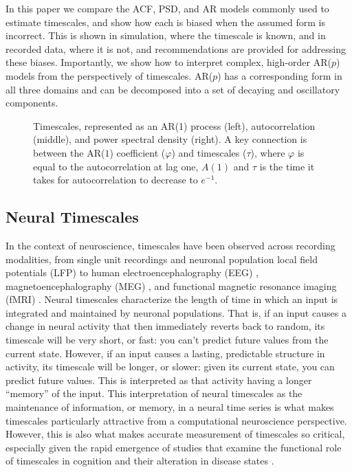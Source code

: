 \documentclass[pdflatex,lineno,sn-nature]{sn-jnl}
\theoremstyle{thmstyleone}
\theoremstyle{thmstyletwo}
\theoremstyle{thmstylethree}
\begin{document}
In this paper we compare the ACF, PSD, and AR models commonly used to estimate timescales, and show how each is biased when the assumed form is incorrect. This is shown in simulation, where the timescale is known, and in recorded data, where it is not, and recommendations are provided for addressing these biases. Importantly, we show how to interpret complex, high-order AR($p$) models from the perspectively of timescales. AR($p$) has a corresponding form in all three domains and can be decomposed into a set of decaying and oscillatory components.

\begin{figure}[htbp]
  \centering
  
  \caption{Timescales, represented as an AR(1) process (left), autocorrelation (middle), and power spectral density (right). A key connection is between the AR($1$) coefficient ($\varphi$) and timescales ($\tau$), where $\varphi$ is equal to the autocorrelation at lag one, $A(1)$ and $\tau$ is the time it takes for autocorrelation to decrease to $e^{-1}$.}
  \label{fig:ar1}
\end{figure}

\subsection{Neural Timescales}\label{sec:neural}

In the context of neuroscience, timescales have been observed across recording modalities, from single unit recordings \cite{murray_hierarchy_2014} and neuronal population local field potentials (LFP) \cite{haider_millisecond_2016} to human electroencephalography (EEG) \cite{meisel_decline_2017}, magnetoencephalography (MEG) \cite{zhigalov_relationship_2015}, and functional magnetic resonance imaging (fMRI) \cite{watanabe_atypical_2019, raut_organization_2020}. Neural timescales characterize the length of time in which an input is integrated and maintained by neuronal populations. That is, if an input causes a change in neural activity that then immediately reverts back to random, its timescale will be very short, or fast: you can't predict future values from the current state. However, if an input causes a lasting, predictable structure in activity, its timescale will be longer, or slower: given its current state, you can predict future values. This is interpreted as that activity having a longer ``memory'' of the input. This interpretation of neural timescales as the maintenance of information, or memory, in a neural time series is what makes timescales particularly attractive from a computational neuroscience perspective. However, this is also what makes accurate measurement of timescales so critical, especially given the rapid emergence of studies that examine the functional role of timescales in cognition \cite{cavanagh_diversity_2020, gao_neuronal_2020} and their alteration in disease states \cite{watanabe_atypical_2019, wengler_distinct_2020}.
\end{document}
